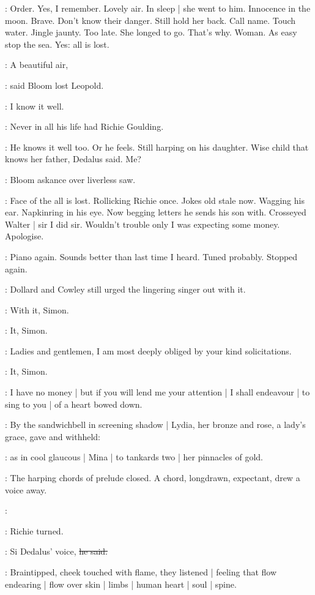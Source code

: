 \BloomInt:
Order.
Yes,
I remember.
Lovely air.
In sleep |
she went to him.
Innocence in the moon.
Brave.
Don't know their danger.
Still hold her back.
Call name.
Touch water.
Jingle jaunty.
Too late.
She longed to go.
That's why.
Woman.
As easy stop the sea.
Yes:
all is lost.

\Bloom:
A beautiful air,

:
said Bloom lost Leopold.

\Bloom:
I know it well.

:
Never in all his life had Richie Goulding.

\BloomInt:
He knows it well too.
Or he feels.
Still harping on his daughter.
Wise child that knows her father,
Dedalus said.
Me?

:
Bloom askance over liverless saw.

\BloomInt:
Face of the all is lost.
Rollicking
Richie once.
Jokes old stale now.
Wagging his ear.
Napkinring in his eye.
Now begging letters he sends his son with.
Crosseyed Walter |
sir I did sir.
Wouldn't trouble only I was expecting some money.
Apologise.

\BloomInt:
Piano again.
Sounds better than last time I heard.
Tuned probably.
Stopped again.

:
Dollard and Cowley still urged the lingering singer out with it.

\dollard:
With it,
Simon.

\cowley:
It,
Simon.

\simon:
Ladies and gentlemen,
I am most deeply obliged by your kind
solicitations.

\cowley:
It,
Simon.

\simon:
I have no money |
but if you will lend me your attention |
I shall endeavour |
to sing to you |
of a heart bowed down.

:
By the sandwichbell
in screening shadow |
Lydia,
her bronze and rose,
a lady's grace,
gave and withheld:

:
as in cool glaucous
 |
Mina |
to tankards two |
her pinnacles of gold.

:
The harping chords of prelude closed.
A chord,
longdrawn,
expectant,
drew a voice away.

\simon:

:
Richie turned.

\goulding:
Si Dedalus' voice,
\sout{he said.}

:
Braintipped,
cheek touched with flame,
they listened |
feeling that flow endearing |
flow over skin |
limbs |
human heart |
soul |
spine.

